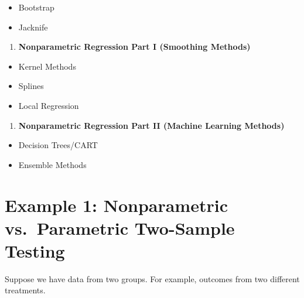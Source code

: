 \documentclass[]{book}
\providecommand{\tightlist}{%
  \setlength{\itemsep}{0pt}\setlength{\parskip}{0pt}}
\begin{document}
\begin{itemize}
\tightlist
\item
  Bootstrap
\item
  Jacknife
\end{itemize}

\begin{enumerate}
\def\labelenumi{\arabic{enumi}.}
\tightlist
\item
  \textbf{Nonparametric Regression Part I (Smoothing Methods)}
\end{enumerate}

\begin{itemize}
\tightlist
\item
  Kernel Methods
\item
  Splines
\item
  Local Regression
\end{itemize}

\begin{enumerate}
\def\labelenumi{\arabic{enumi}.}
\tightlist
\item
  \textbf{Nonparametric Regression Part II (Machine Learning Methods)}
\end{enumerate}

\begin{itemize}
\tightlist
\item
  Decision Trees/CART
\item
  Ensemble Methods
\end{itemize}

\hypertarget{sec:example-nonpar-tests}{%
\section{Example 1: Nonparametric vs.~Parametric Two-Sample Testing}\label{sec:example-nonpar-tests}}

Suppose we have data from two groups. For example, outcomes from
two different treatments.
\end{document}

